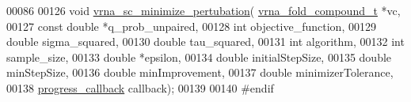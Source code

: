 \begin{DoxyCode}
00086 
00126 \textcolor{keywordtype}{void} \hyperlink{group__soft__constraints_gaa124bdc20d88001c38ade590c4bcc3c4}{vrna\_sc\_minimize\_pertubation}(
      \hyperlink{group__fold__compound_structvrna__fc__s}{vrna\_fold\_compound\_t} *vc,
00127                                   \textcolor{keyword}{const} \textcolor{keywordtype}{double} *q\_prob\_unpaired,
00128                                   \textcolor{keywordtype}{int} objective\_function,
00129                                   \textcolor{keywordtype}{double} sigma\_squared,
00130                                   \textcolor{keywordtype}{double} tau\_squared,
00131                                   \textcolor{keywordtype}{int} algorithm,
00132                                   \textcolor{keywordtype}{int} sample\_size,
00133                                   \textcolor{keywordtype}{double} *epsilon,
00134                                   \textcolor{keywordtype}{double} initialStepSize,
00135                                   \textcolor{keywordtype}{double} minStepSize,
00136                                   \textcolor{keywordtype}{double} minImprovement,
00137                                   \textcolor{keywordtype}{double} minimizerTolerance,
00138                                   \hyperlink{group__soft__constraints_gafd57325a0fa4307cd72f933107f9d493}{progress\_callback} callback);
00139 
00140 \textcolor{preprocessor}{#endif}
\end{DoxyCode}
